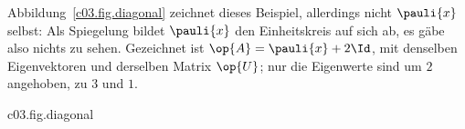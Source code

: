 Abbildung~\ref{c03.fig.diagonal} zeichnet dieses Beispiel, allerdings nicht $\pauli{x}$ selbst:
Als Spiegelung bildet $\pauli{x}$ den Einheitskreis auf sich ab, es gäbe also nichts zu sehen.
Gezeichnet ist $\op{A} = \pauli{x} + 2\Id$, mit denselben Eigenvektoren und derselben Matrix
$\op{U}$; nur die Eigenwerte sind um $2$ angehoben, zu $3$ und $1$.

\begin{tpcfigure}{c03.fig.diagonal}
  \caption{Derselbe Operator in zwei Basen. Gezeichnet ist das Bild des Einheitskreises unter
    $\op{A} = \pauli{x} + 2\Id$, als Operator auf $\mathbb{R}^2 \subset \mathbb{C}^2$. Links,
    in der kanonischen Basis $\ket{0}, \ket{1}$, ist die Matrix
    $\bigl(\begin{smallmatrix} 2 & 1 \\ 1 & 2 \end{smallmatrix}\bigr)$, und die Bildellipse
    liegt schief. Rechts, in der Basis $\ket{\phi_0}, \ket{\phi_1}$ aus
    Gleichung~\eqref{c03.eq.hadamard-eigen}, ist die Matrix $\diag(3, 1)$, und die Ellipse liegt
    auf den Achsen. Die Hauptachsen liegen auf den Eigenvektoren, die Halbachsen sind die Eigenwerte $3$ und
    $1$. Der Wechsel von links nach rechts ist die Hadamard-Matrix $\op{U}$ aus
    Gleichung~\eqref{c03.eq.hadamard}.}
\end{tpcfigure}

